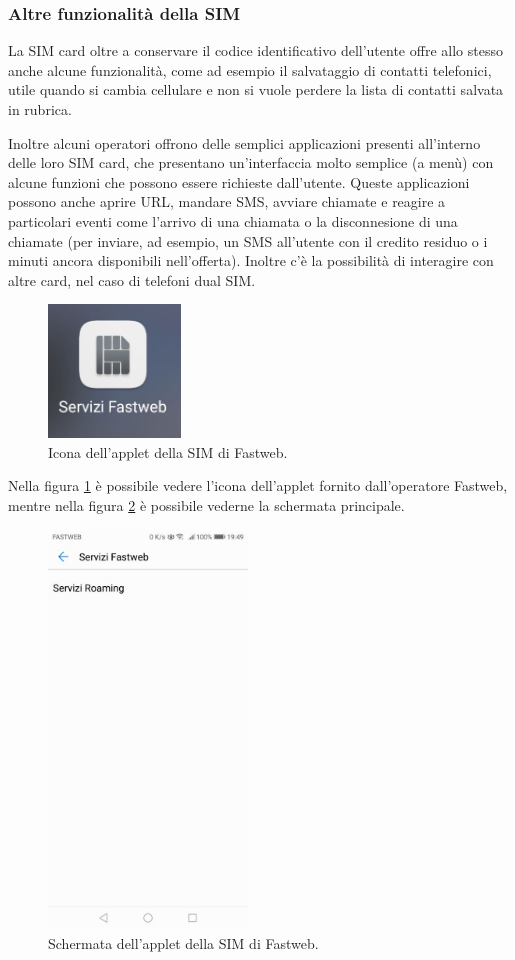 \subsubsection{Altre funzionalità della SIM}
La SIM card oltre a conservare il codice identificativo dell'utente offre allo stesso anche alcune funzionalità, come ad esempio il salvataggio di contatti telefonici, utile quando si cambia cellulare e non si vuole perdere la lista di contatti salvata in rubrica.

Inoltre alcuni operatori offrono delle semplici applicazioni presenti all'interno delle loro SIM card, che presentano un'interfaccia molto semplice (a menù) con alcune funzioni che possono essere richieste dall'utente. Queste applicazioni possono anche aprire URL, mandare SMS, avviare chiamate e reagire a particolari eventi come l'arrivo di una chiamata o la disconnesione di una chiamate (per inviare, ad esempio, un SMS all'utente con il credito residuo o i minuti ancora disponibili nell'offerta). Inoltre c'è la possibilità di interagire con altre card, nel caso di telefoni dual SIM.

\begin{figure}[h!]
  \centering
  \includegraphics[width=100pt]{pictures/icona_aplet_fastweb.jpg}
  \caption{Icona dell'applet della SIM di Fastweb.}
  \label{fig:app_icon}
\end{figure}

Nella figura \ref{fig:app_icon} è possibile vedere l'icona dell'applet fornito dall'operatore Fastweb, mentre nella figura \ref{fig:app_screen} è possibile vederne la schermata principale.

\begin{figure}[h!]
  \centering
  \includegraphics[width=150pt]{pictures/screen_aplet_fastweb.jpg}
  \caption{Schermata dell'applet della SIM di Fastweb.}
  \label{fig:app_screen}
\end{figure}

